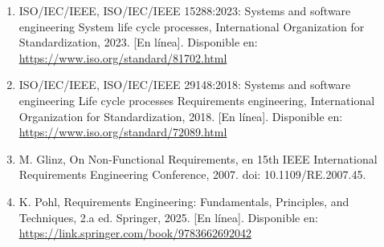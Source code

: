 \begin{enumerate}
\item ISO/IEC/IEEE, ISO/IEC/IEEE 15288:2023: Systems and software engineering System life cycle processes, International Organization for Standardization, 2023. [En línea]. Disponible en: \url{https://www.iso.org/standard/81702.html}
\item ISO/IEC/IEEE, ISO/IEC/IEEE 29148:2018: Systems and software engineering Life cycle processes Requirements engineering, International Organization for Standardization, 2018. [En línea]. Disponible en: \url{https://www.iso.org/standard/72089.html}
\item M. Glinz, On Non-Functional Requirements, en 15th IEEE International Requirements Engineering Conference, 2007. doi: 10.1109/RE.2007.45.
\item K. Pohl, Requirements Engineering: Fundamentals, Principles, and Techniques, 2.a ed. Springer, 2025. [En línea]. Disponible en: \url{https://link.springer.com/book/9783662692042}
\end{enumerate}
\endgroup
